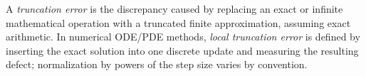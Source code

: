
A \emph{truncation error} is the discrepancy caused by replacing an exact or infinite mathematical operation with a truncated finite approximation, assuming exact arithmetic. In numerical ODE/PDE methods, \emph{local truncation error} is defined by inserting the exact solution into one discrete update and measuring the resulting defect; normalization by powers of the step size varies by convention.
